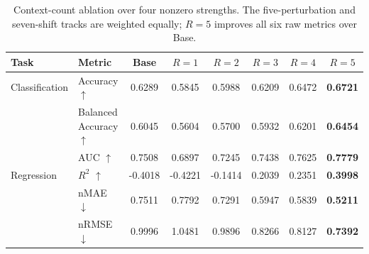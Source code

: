 \ifdefined\ICLRLayout
\begin{table}[H]
\else
\begin{table}[H]
\fi
  \centering
  \caption{Context-count ablation over four nonzero strengths. The five-perturbation and seven-shift tracks are weighted equally; $R=5$ improves all six raw metrics over Base.}
  \label{tab:context-count}
  \small
  \setlength{\tabcolsep}{5.2pt}
  \begin{tabular}{llcccccc}
    \toprule
    Task & Metric & Base & $R=1$ & $R=2$ & $R=3$ & $R=4$ & $R=5$ \\
    \midrule
    Classification & Accuracy $\uparrow$          & 0.6289 & 0.5845 & 0.5988 & 0.6209 & 0.6472 & \textbf{0.6721} \\
                   & Balanced Accuracy $\uparrow$ & 0.6045 & 0.5604 & 0.5700 & 0.5932 & 0.6201 & \textbf{0.6454} \\
                   & AUC $\uparrow$               & 0.7508 & 0.6897 & 0.7245 & 0.7438 & 0.7625 & \textbf{0.7779} \\
    \addlinespace
    Regression     & $R^2$ $\uparrow$             & -0.4018 & -0.4221 & -0.1414 & 0.2039 & 0.2351 & \textbf{0.3998} \\
                   & nMAE $\downarrow$            & 0.7511 & 0.7792 & 0.7291 & 0.5947 & 0.5839 & \textbf{0.5211} \\
                   & nRMSE $\downarrow$           & 0.9996 & 1.0481 & 0.9896 & 0.8266 & 0.8127 & \textbf{0.7392} \\
    \bottomrule
  \end{tabular}
\ifdefined\ICLRLayout
\end{table}
\else
\end{table}
\fi
